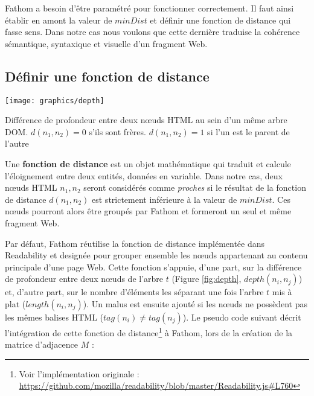 \documentclass[symmetric,justified,marginals=raggedouter]{tufte-book}
\begin{document}
\begin{algorithm}
\end{algorithm}

\noindent Fathom a besoin d'être paramétré pour fonctionner correctement. Il faut ainsi établir en amont la valeur de $minDist$ et définir une fonction de distance qui fasse sens. Dans notre cas nous voulons que cette dernière traduise la cohérence sémantique, syntaxique et visuelle d'un fragment Web. 

\subsection{Définir une fonction de distance}

\begin{marginfigure}%
  \texttt{[image: graphics/depth]}
  \vspace*{0.2cm}  
  \caption{Différence de profondeur entre deux nœuds HTML au sein d'un même arbre DOM. $d(n_1,n_2)=0$ s'ils sont frères. $d(n_1,n_2)=1$ si l'un est le parent de l'autre}
  \label{fig:depth}
\end{marginfigure}

\noindent Une \textbf{fonction de distance} est un objet mathématique qui traduit et calcule l'éloignement entre deux entités, données en variable. Dans notre cas, deux nœuds HTML $n_1,n_2$ seront considérés comme \textit{proches} si le résultat de la fonction de distance $d(n_1,n_2)$ est strictement inférieure à la valeur de $minDist$. Ces nœuds pourront alors être groupés par Fathom et formeront un seul et même fragment Web. 

Par défaut, Fathom réutilise la fonction de distance implémentée dans Readability et designée pour grouper ensemble les nœuds appartenant au contenu principale d'une page Web. Cette fonction s'appuie, d'une part, sur la différence de profondeur entre deux nœuds de l'arbre $t$ (Figure \ref{fig:depth}, $depth(n_i,n_j)$) et, d'autre part, sur le nombre d'éléments les séparant une fois l'arbre $t$ mis à plat ($length(n_i,n_j)$). Un malus est ensuite ajouté si les nœuds ne possèdent pas les mêmes balises HTML ($tag(n_i) \neq tag(n_j)$). Le pseudo code suivant décrit l'intégration de cette fonction de distance\footnote{Voir l'implémentation originale : \url{https://github.com/mozilla/readability/blob/master/Readability.js\#L760}} à Fathom, lors de la création de la matrice d'adjacence $M$ :  
\end{document}
